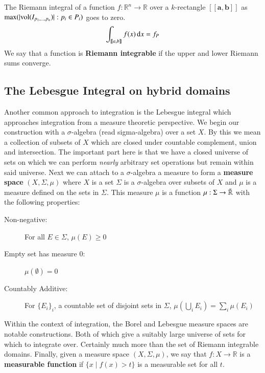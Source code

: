 \begin{definition}
The Riemann integral of a function $f:\mathbb{R}^n \to \mathbb{R}$ over a $k$-rectangle 
$[\![\boldsymbol{a}, \boldsymbol{b}]\!]$ as $\max( | \text{vol}( I_{p_1,\ldots, p_n}) | : p_i \in P_i )$ goes to zero.
	\begin{equation}
		\int_{[\![a,b]\!]} f(x) \mathop{}\!\mathrm{d} x = f_P
	\end{equation} 
	We say that a function is \textbf{Riemann integrable} if the upper and lower Riemann sums converge.
\end{definition}


\subsection{The Lebesgue Integral on hybrid domains}

Another common approach to integration is the Lebesgue integral which approaches integration from a measure theoretic
perspective.
We begin our construction with a $\sigma$-algebra (read sigma-algebra) over a set $X$.
By this we mean a collection of subsets of $X$ which are closed under countable complement, union and intersection.
The important part here is that we have a closed universe of sets on which we can perform 
\emph{nearly} arbitrary set operations but remain within said universe.
Next we can attach to a $\sigma$-algebra a measure to form a \textbf{measure space} $(X, \Sigma, \mu)$ 
where $X$ is a set $\Sigma$ is a $\sigma$-algebra  over subsets of $X$ and $\mu$ is a measure defined on the sets in
 $\Sigma$.
This measure $\mu$ is a function $\mu: \Sigma \to \bar{\mathbb{R}}$ with the following properties:
\begin{description}
	\item[Non-negative:] For all $E \in \Sigma$, $\mu(E) \geq 0$
	\item[Empty set has measure 0:] $\mu(\emptyset) = 0$
	\item[Countably Additive:] For $\{E_i\}_i$, a countable set of disjoint sets in $\Sigma$,
		$\mu \left( \bigcup_i E_i \right) = \sum_i \mu(E_i)$
\end{description}
Within the context of integration, the Borel and Lebesgue measure spaces are notable constructions.
Both of which give a suitably large universe of sets for which to integrate over.
Certainly much more than the set of Riemann integrable domains.
Finally, given a measure space $(X, \Sigma, \mu)$, we say that $f : X \to \mathbb{R}$ is a \textbf{measurable function}
if  $\{ x \; | \; f(x) > t\}$ is a measurable set for all $t$.



